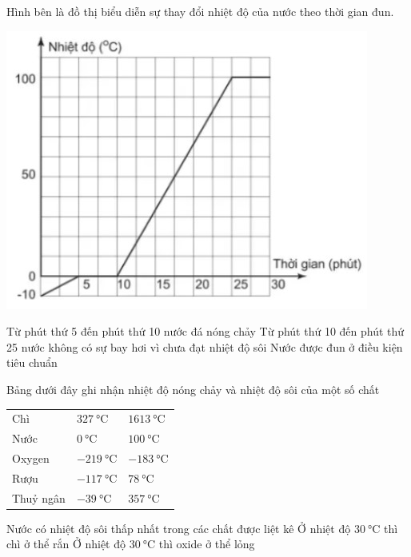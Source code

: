 \begin{ex}
	Hình bên là đồ thị biểu diễn sự thay đổi nhiệt độ của nước theo thời gian đun.
	\begin{center}
		\includegraphics[width=0.45\linewidth]{figs/VN12-Y24-PH-SYL-001P-4}
	\end{center}
	{\True Từ phút thứ 5 đến phút thứ 10 nước đá nóng chảy}
	{Từ phút thứ 10 đến phút thứ 25 nước không có sự bay hơi vì chưa đạt nhiệt độ sôi}
	{\True Nước được đun ở điều kiện tiêu chuẩn}
\end{ex}
\begin{ex}
	Bảng dưới đây ghi nhận nhiệt độ nóng chảy và nhiệt độ sôi của một số chất
	\begin{center}
		\begin{tabular}{|C{8em}|C{12em}|C{8em}|}
			\hline
			&  &\\
			\hline
			Chì & $\SI{327}{\celsius}$ & $\SI{1613}{\celsius}$\\
			\hline
			Nước & $\SI{0}{\celsius}$ & $\SI{100}{\celsius}$\\
			\hline
			Oxygen & $\SI{-219}{\celsius}$ & $\SI{-183}{\celsius}$\\
			\hline
			Rượu & $\SI{-117}{\celsius}$ & $\SI{78}{\celsius}$\\
			\hline
			Thuỷ ngân & $\SI{-39}{\celsius}$ & $\SI{357}{\celsius}$\\
			\hline
		\end{tabular}
	\end{center}
	{Nước có nhiệt độ sôi thấp nhất trong các chất được liệt kê}
	{\True Ở nhiệt độ $\SI{30}{\celsius}$ thì chì ở thể  rắn}
	{Ở nhiệt độ $\SI{30}{\celsius}$ thì oxide ở thể lỏng}
	\loigiai{}
\end{ex}

